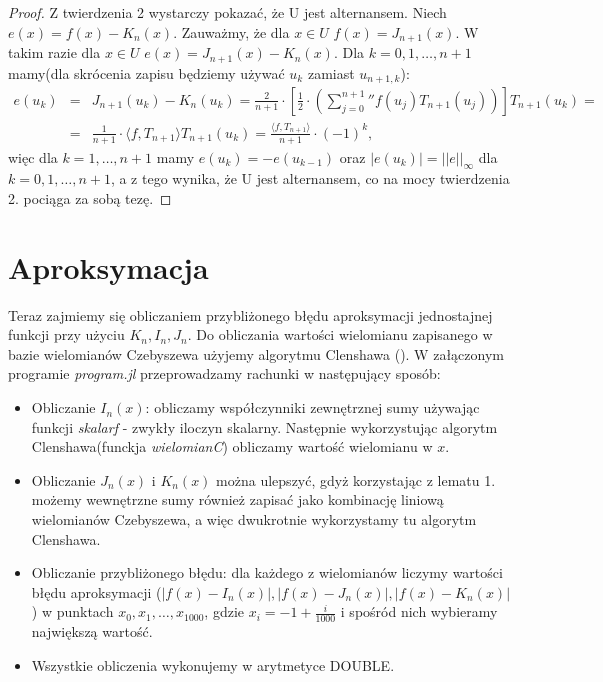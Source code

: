 \documentclass[12pt,wide]{mwart}
\begin{document}
\begin{proof}
Z twierdzenia 2 wystarczy pokazać, że U jest alternansem. Niech $e(x) = f(x) - K_n(x)$. Zauważmy, że dla $x \in U \, \, f(x) = J_{n+1}(x)$. W takim razie dla $x \in U \, \, e(x) = J_{n+1}(x) - K_n(x)$. Dla $k = 0,1,\ldots,n+1$ mamy(dla skrócenia zapisu będziemy używać $u_k$ zamiast $u_{n+1,k}$):
\begin{eqnarray*}
e(u_k) &=& J_{n+1}(u_k) - K_n(u_k) = \frac{2}{n+1} \cdot \left[\frac{1}{2} \cdot \left( \sum_{j=0}^{n+1}'' f(u_j)T_{n+1}(u_j)\right)\right]T_{n+1}(u_k) =\\ &=& \frac{1}{n+1} \cdot \langle f,T_{n+1} \rangle T_{n+1}(u_k) = \frac{\langle f,T_{n+1} \rangle}{n+1} \cdot (-1)^k,
\end{eqnarray*} 
więc dla $k = 1,\ldots,n+1$ mamy $e(u_k) = -e(u_{k-1})$ oraz $|e(u_k)| = ||e||_\infty$ dla $k = 0,1,\ldots,n+1$, a z tego wynika, że U jest alternansem, co na mocy twierdzenia 2. pociąga za sobą tezę.
\end{proof}

\section{Aproksymacja}
Teraz zajmiemy się obliczaniem przybliżonego błędu aproksymacji jednostajnej funkcji przy użyciu $K_n,I_n,J_n$. Do obliczania wartości wielomianu zapisanego w bazie wielomianów Czebyszewa użyjemy algorytmu Clenshawa (\cite[strona 275]{Pas}). W załączonym programie \textit{program.jl} przeprowadzamy rachunki w następujący sposób: 

\begin{itemize}
\item Obliczanie $I_n(x)$: obliczamy współczynniki zewnętrznej sumy używając funkcji \textit{skalarf} - zwykły iloczyn skalarny. Następnie wykorzystując algorytm Clenshawa(funckja \textit{wielomianC}) obliczamy wartość wielomianu w $x$.

\item Obliczanie $J_n(x)$ i $K_n(x)$ można ulepszyć, gdyż korzystając z lematu 1. możemy wewnętrzne sumy również zapisać jako kombinację liniową wielomianów Czebyszewa, a więc dwukrotnie wykorzystamy tu algorytm Clenshawa.

\item Obliczanie przybliżonego błędu: dla każdego z wielomianów liczymy wartości błędu aproksymacji ($|f(x) - I_n(x)|,|f(x) - J_n(x)|,|f(x) - K_n(x)|$) w punktach $x_0,x_1,\ldots,x_{1000}$, gdzie $x_i = -1 + \frac{i}{1000}$ i spośród nich wybieramy największą wartość. 
\item Wszystkie obliczenia wykonujemy w arytmetyce DOUBLE.
\end{itemize} 
\end{document}
